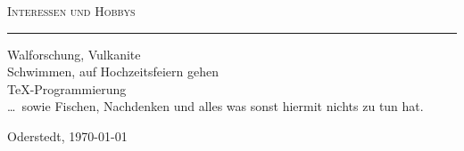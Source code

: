 \documentclass[a4paper,11pt]{scrartcl}
\begin{document}
\textsc{Interessen und Hobbys}\par
\noindent\rule[1ex]{\textwidth}{0.2pt}

Walforschung, Vulkanite\\
Schwimmen, auf Hochzeitsfeiern gehen\\
\TeX-Programmierung\\
\dots\ sowie Fischen, Nachdenken und alles was sonst hiermit nichts zu tun hat.
\vspace*{1cm}

Oderstedt, \today
\end{document}
